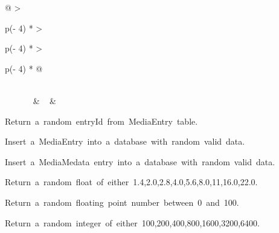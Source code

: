 \begin{longtable}[]{@{}
  >{\raggedright\arraybackslash}p{(\columnwidth - 4\tabcolsep) * }
  >{\raggedright\arraybackslash}p{(\columnwidth - 4\tabcolsep) * }
  >{\raggedright\arraybackslash}p{(\columnwidth - 4\tabcolsep) * }@{}}
\toprule
\endhead
{} \\
{~~~~~~} & ~ & \begin{minipage}[t]{\linewidth}\raggedright
\begin{description}
\tightlist
\item[\protect\hypertarget{-getRandomMediaEntryEntryId}{}{\textbf{getRandomMediaEntryEntryId}}(db)
-\textgreater{} int]
{Return~a~random~entryId~from~MediaEntry~table.}
\end{description}

\begin{description}
\tightlist
\item[\protect\hypertarget{-insertRandomMediaEntry}{}{\textbf{insertRandomMediaEntry}}(db)]
{Insert~a~MediaEntry~into~a~database~with~random~valid~data.}
\end{description}

\begin{description}
\tightlist
\item[\protect\hypertarget{-insertRandomMediaMetadata}{}{\textbf{insertRandomMediaMetadata}}(db)]
{Insert~a~MediaMedata~entry~into~a~database~with~random~valid~data.}
\end{description}

\begin{description}
\tightlist
\item[\protect\hypertarget{-randApertureSize}{}{\textbf{randApertureSize}}()
-\textgreater{} float]
{Return~a~random~float~of~either~1.4,2.0,2.8,4.0,5.6,8.0,11,16.0,22.0.}
\end{description}

\begin{description}
\tightlist
\item[\protect\hypertarget{-randDissolvedOxygen}{}{\textbf{randDissolvedOxygen}}()
-\textgreater{} float]
{Return~a~random~floating~point~number~between~0~and~100.}
\end{description}

\begin{description}
\tightlist
\item[\protect\hypertarget{-randISO}{}{\textbf{randISO}}()
-\textgreater{} int]
{Return~a~random~integer~of~either~100,200,400,800,1600,3200,6400.}
\end{description}


\end{minipage}
\end{longtable}
